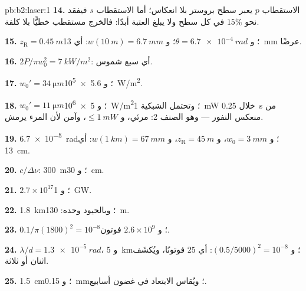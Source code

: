 \begin{solution}{pb:b2:laser:1}
\textbf{14.} الاستقطاب $p$ يعبر سطح بروستر بلا
انعكاس؛ أما الاستقطاب $s$ فيفقد نحو $15\%$ في كل سطح ولا
يبلغ العتبة أبدًا: فالخرج مستقطب خطيًّا بلا كلفة.

\textbf{15.} $z_{\text{R}} = \qty{0.45}{m}$؛ و $\theta = \qty{6.7e-4}{rad}$؛ و $w(\qty{10}{m})
= \qty{6.7}{mm}$: أي \qty{13}{mm} عرضًا.

\textbf{16.} $2P/\pi w_0^2 = \qty{7}{kW/m^2}$: أي سبع شموس.

\textbf{17.} $w_0' = \qty{34}{\micro m}$؛ و \qty{5.6e5}{W/m^2}.

\textbf{18.} $w_0' = \qty{11}{\micro m}$؛ و \qty{5e6}{W/m^2}؛ وتحتمل الشبكية
\qty{1}{mW} خلال \qty{0.25}{s} من منعكس النفور --- وهو الصنف 2: مرئي،
و $\le \qty{1}{mW}$، وآمن لأن المرء يرمش.

\textbf{19.} \qty{6.7e-5}{rad}؛ و $w_0 = \qty{3}{mm}$، و $z_{\text{R}} = \qty{45}{m}$،
و $w(\qty{1}{km}) = \qty{67}{mm}$: أي \qty{13}{cm}.

\textbf{20.} $c/\Delta\nu$: \qty{300}{m}؛ و \qty{30}{cm}.

\textbf{21.} $2.7 \times 10^{17}$؛ و \qty{1}{GW}.

\textbf{22.} \qty{1.8}{km}؛ وبالحيود وحده: \qty{130}{m}.

\textbf{23.} $0.1/\pi(1800)^2 = 10^{-8}$؛ و $2.6 \times 10^9$ فوتون.

\textbf{24.} $\lambda/d = \qty{1.3e-5}{rad}$، و \qty{5}{km}؛ و $(0.5/5000)^2 = 10^{-8}$:
أي $25$ فوتونًا، ويُكشَف اثنان أو ثلاثة.

\textbf{25.} \qty{1.5}{cm}؛ و \qty{0.15}{mm}؛ ويُقاس الابتعاد في غضون
أسابيع.
\end{solution}
